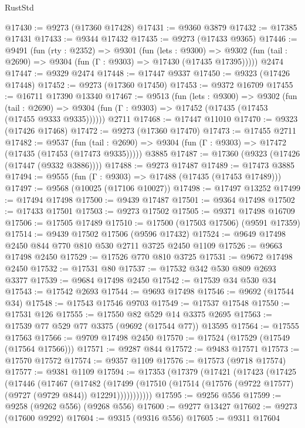 \begin{lexlean}{RustStd}
\begin{coremodule}
{\begin{coremodule}
{{{{{{{{{{{{{{{{{{{{{{{{{{{{{{{{{{{{{{{{{{{{{{{{{{{{{{{@17430 := @9273 (@17360 @17428)
@17431 := @9360 @3879
@17432 := @17385 @17431
@17433 := @9344 @17432
@17435 := @9273 (@17433 @9365)
@17446 := @9491
    (fun (rty : @2352) =>
    @9301
      (fun (lets : @9300) =>
      @9302 (fun (tail : @2690) => @9304 (fun (Γ : @9303) => @17430 (@17435 @17395)))))
    @2474
@17447 := @9329 @2474
@17448 := @17447 @9337
@17450 := @9323 (@17426 @17448)
@17452 := @9273 (@17360 @17450)
@17453 := @9372 @16709
@17455 := @16711 @17390 @13340
@17467 := @9513
    (fun (lets : @9300) =>
    @9302
      (fun (tail : @2690) =>
      @9304 (fun (Γ : @9303) => @17452 (@17435 (@17453 (@17455 @9333 @9335))))))
    @2711
@17468 := @17447 @11010
@17470 := @9323 (@17426 @17468)
@17472 := @9273 (@17360 @17470)
@17473 := @17455 @2711
@17482 := @9537
    (fun (tail : @2690) => @9304 (fun (Γ : @9303) => @17472 (@17435 (@17453 (@17473 @9335)))))
    @3885
@17487 := @17360 (@9323 (@17426 (@17447 (@9332 @3886))))
@17488 := @9273 @17487
@17489 := @17473 @3885
@17494 := @9555 (fun (Γ : @9303) => @17488 (@17435 (@17453 @17489)))
@17497 := @9568 (@10025 (@17106 @10027))
@17498 := @17497 @13252
@17499 := @17494 @17498
@17500 := @9439 @17487
@17501 := @9364 @17498
@17502 := @17433 @17501
@17503 := @9273 @17502
@17505 := @9371 @17498 @16709
@17506 := @17505 @17489
@17510 := @17500 (@17503 @17506) (@9591 @17359)
@17514 := @9439 @17502 @17506 (@9596 @17432)
@17524 := @9649 @17498 @2450 @844 @770 @810 @530 @2711 @3725 @2450 @1109
@17526 := @9663 @17498 @2450
@17529 := @17526 @770 @810 @3725
@17531 := @9672 @17498 @2450
@17532 := @17531 @80
@17537 := @17532 @342 @530 @809 @2693 @3377
@17539 := @9684 @17498 @2450
@17542 := @17539 @34 @530 @34
@17543 := @17542 @2693
@17544 := @9693 @17498
@17546 := @9692 (@17544 @34)
@17548 := @17543 @17546 @9703
@17549 := @17537 @17548
@17550 := @17531 @126
@17555 := @17550 @82 @529 @14 @3375 @2695
@17563 := @17539 @77 @529 @77 @3375 (@9692 (@17544 @77)) @13595
@17564 := @17555 @17563
@17566 := @9709 @17498 @2450
@17570 := @17524 (@17529 (@17549 (@17564 @17566)))
@17571 := @9287 @844
@17572 := @9483 @17571
@17573 := @17570 @17572
@17574 := @9357 @1109
@17576 := @17573 (@9718 @17574)
@17577 := @9381 @1109
@17594 := @17353
    (@17379
      (@17421
        (@17423
          (@17425
            (@17446
              (@17467
                (@17482
                  (@17499
                    (@17510 (@17514 (@17576 (@9722 @17577) (@9727 (@9729 @844)) @12291)))))))))))
@17595 := @9256 @556
@17599 := @9258 (@9262 @556) (@9268 @556)
@17600 := @9277 @13427
@17602 := @9273 (@17600 @9292)
@17604 := @9315 (@9316 @556)
@17605 := @9311 @17604
}}}}}}}}}}}}}}}}}}}}}}}}}}}}}}}}}}}}}}}}}}}}}}}}}}}}}}}
\end{coremodule}}
\end{coremodule}
\end{lexlean}
